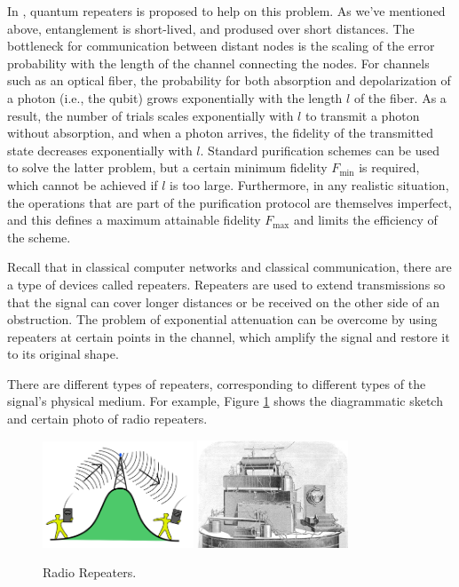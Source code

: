 \documentclass[10pt]{article}
\begin{document}
In \cite{briegel1998quantum}, quantum repeaters is proposed to help on this problem. As we've mentioned above, entanglement is short-lived, and prodused over short distances. The bottleneck for communication between distant nodes is the scaling of the error probability with the length of the channel connecting the nodes.  For channels such as an optical fiber, the probability for both absorption and depolarization of a photon (i.e., the qubit) grows exponentially with the length $l$ of the fiber. As a result, the number of trials scales exponentially with $l$ to transmit a photon without absorption, and when a photon arrives, the fidelity of the transmitted state decreases exponentially with $l$. Standard purification schemes\cite{bennett1996purification} can be used to solve the latter problem, but a certain minimum fidelity $F_{\min}$ is required, which cannot be achieved if $l$ is too large. Furthermore, in any realistic situation, the operations that are part of the purification protocol are themselves imperfect, and this defines a maximum attainable fidelity $F_{\max}$ and limits the efficiency of the scheme. 

Recall that in classical computer networks and classical communication, there are a type of devices called repeaters. Repeaters are used to extend transmissions so that the signal can cover longer distances or be received on the other side of an obstruction. The problem of exponential attenuation can be overcome by using repeaters at certain points in the channel, which amplify the signal and restore it to its original shape.

There are different types of repeaters, corresponding to different types of the signal's physical medium. For example, Figure \ref{repeater} shows the diagrammatic sketch and certain photo of radio repeaters.

\begin{figure}[htbp]
    \centering
    \includegraphics[width=0.4\textwidth]{figure/repeater.jpg}
    \includegraphics[width=0.4\textwidth]{figure/repeater2.jpg}
    \caption{Radio Repeaters.}
    \label{repeater}
\end{figure}
\end{document}
